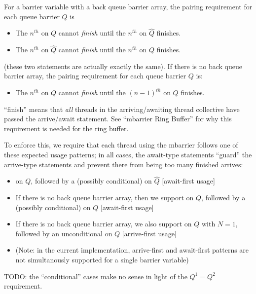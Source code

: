 For a  barrier variable with a back queue barrier array, the pairing requirement for each queue barrier $Q$ is
\begin{itemize}
  \item The $n^{th}$  on $Q$ cannot \textit{finish} until the $n^{th}$  on $\widehat{Q}$ finishes.
  \filbreak
  \item The $n^{th}$  on $\widehat{Q}$ cannot \textit{finish} until the $n^{th}$  on $Q$ finishes.
\end{itemize}
(these two statements are actually exactly the same).
\filbreak
If there is no back queue barrier array, the pairing requirement for each queue barrier $Q$ is:
\begin{itemize}
  \item The $n^{th}$  on $Q$ cannot \textit{finish} until the $(n-1)^{th}$  on $Q$ finishes.
\end{itemize}

\filbreak
``finish'' means that \textit{all} threads in the arriving/awaiting thread collective have passed the arrive/await statement.
See ``mbarrier Ring Buffer'' for why this requirement is needed for the ring buffer.

\filbreak
To enforce this, we require that each thread using the mbarrier follows one of these expected usage patterns; in all cases, the await-type statements ``guard'' the arrive-type statements and prevent there from being too many finished arrives:
\begin{itemize}
  \item {} on $Q$, followed by a (possibly conditional)  on $\widehat{Q}$ [await-first usage]
  \filbreak
  \item If there is no back queue barrier array, then we support  on $Q$, followed by a (possibly conditional)  on $Q$ [await-first usage]
  \filbreak
  \item If there is no back queue barrier array, we also support  on $Q$ with $N=1$, followed by an unconditional  on $Q$ [arrive-first usage]
  \item (Note: in the current implementation, arrive-first and await-first patterns are not simultanously supported for a single barrier variable)
\end{itemize}
TODO: the ``conditional'' cases make no sense in light of the $Q^1 = Q^2$ requirement.

